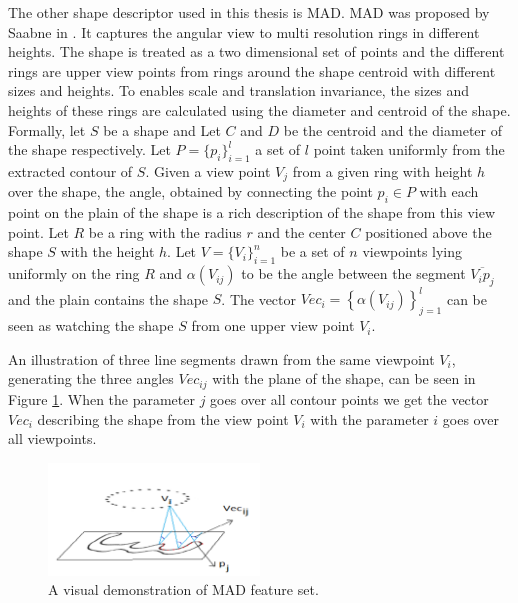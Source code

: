 \iftoggle{edit-mode}{\hspace{0pt}\marginpar{MAD}}{}
The other shape descriptor used in this thesis is MAD.
MAD was proposed by Saabne in \cite{saabni2013multi}. 
It captures the angular view to multi resolution rings in different heights. 
The shape is treated as a two dimensional set of points and the different rings are upper view points from rings around the shape centroid with different sizes and heights. 
To enables scale and translation invariance, the sizes and heights of these rings are calculated using the diameter and centroid of the shape.
Formally, let $S$ be a shape and Let $C$ and $D$ be the centroid and the diameter of the shape respectively. 
Let $P = \{p_i\}_{i = 1}^l$ a set of $l$ point taken uniformly from the extracted contour of $S$. 
Given a view point $V_j$ from a given ring with height $h$ over the shape, the angle, obtained by connecting the point ${p_i} \in P$ with each point on the plain of the shape is a rich description of the shape from this view point. 
Let $R$ be a ring with the radius $r$ and the center $C$ positioned above the shape $S$ with the height $h$. 
Let $V = \{V_i\}_{i = 1}^n$ be a set of $n$ viewpoints lying uniformly on the ring $R$ and $\alpha(V_{ij})$ to be the angle between the segment $\overline {{V_i}{p_j}}$ and the plain contains the shape $S$. 
The vector $Ve{c_i} = \left\{ {\alpha \left( {{V_{ij}}} \right)} \right\}_{j = 1}^l$ can be seen as watching the shape $S$ from one upper view point $V_i$. 

An illustration of three line segments drawn from the same viewpoint $V_i$, generating the three angles $Vec_{ij}$ with the plane of the shape, can be seen in Figure \ref{fig:mad_demo}.
When the parameter $j$ goes over all contour points we get the vector $Vec_i$ describing the shape from the view point $V_i$ with the parameter $i$ goes over all viewpoints.

\begin{figure}
\centering
\includegraphics[width=0.5\textwidth]{./figures/mad_demo}       
\caption{A visual demonstration of MAD feature set.}
\label{fig:mad_demo}
\end{figure}

